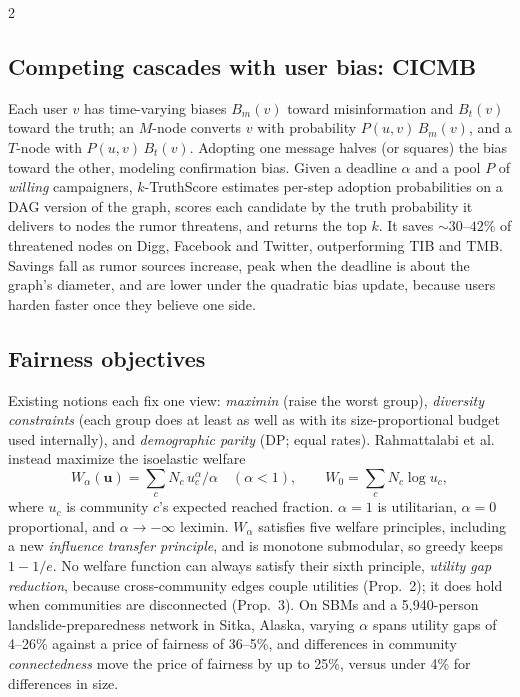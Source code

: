 \documentclass[11pt]{article}
\begin{document}
\begin{multicols}{2}
\subsection{Competing cascades with user bias: CICMB \cite{cicmb}}
Each user $v$ has time-varying biases $B_m(v)$ toward misinformation and $B_t(v)$ toward the truth; an $M$-node converts $v$ with probability $P(u,v)\,B_m(v)$, and a $T$-node with $P(u,v)\,B_t(v)$. Adopting one message halves (or squares) the bias toward the other, modeling confirmation bias. Given a deadline $\alpha$ and a pool $P$ of \emph{willing} campaigners, $k$-TruthScore estimates per-step adoption probabilities on a DAG version of the graph, scores each candidate by the truth probability it delivers to nodes the rumor threatens, and returns the top $k$. It saves ${\sim}30$--$42\%$ of threatened nodes on Digg, Facebook and Twitter, outperforming TIB and TMB. Savings fall as rumor sources increase, peak when the deadline is about the graph's diameter, and are lower under the quadratic bias update, because users harden faster once they believe one side.

\subsection{Fairness objectives \cite{welfare,fang}}
Existing notions each fix one view: \emph{maximin} (raise the worst group), \emph{diversity constraints} (each group does at least as well as with its size-proportional budget used internally), and \emph{demographic parity} (DP; equal rates). Rahmattalabi et al.\ \cite{welfare} instead maximize the isoelastic welfare
\[
W_\alpha(\mathbf u)=\textstyle\sum_c N_c\,u_c^{\alpha}/\alpha\quad(\alpha<1),\qquad W_0=\textstyle\sum_c N_c\log u_c,
\]
where $u_c$ is community $c$'s expected reached fraction. $\alpha=1$ is utilitarian, $\alpha=0$ proportional, and $\alpha\to-\infty$ leximin. $W_\alpha$ satisfies five welfare principles, including a new \emph{influence transfer principle}, and is monotone submodular, so greedy keeps $1-1/e$. No welfare function can always satisfy their sixth principle, \emph{utility gap reduction}, because cross-community edges couple utilities (Prop.~2); it does hold when communities are disconnected (Prop.~3). On SBMs and a 5,940-person landslide-preparedness network in Sitka, Alaska, varying $\alpha$ spans utility gaps of 4--26\% against a price of fairness of 36--5\%, and differences in community \emph{connectedness} move the price of fairness by up to 25\%, versus under 4\% for differences in size.


\end{multicols}
\end{document}
